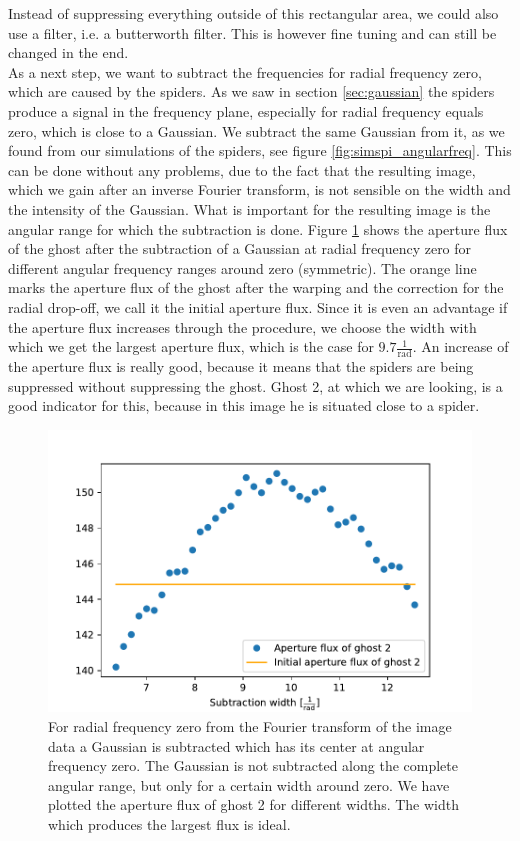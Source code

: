 Instead of suppressing everything outside of this rectangular area, we could also use a filter, i.e. a butterworth filter. This is however fine tuning and can still be changed in the end.\\
As a next step, we want to subtract the frequencies for radial frequency zero, which are caused by the spiders. As we saw in section \ref{sec:gaussian} the spiders produce a signal in the frequency plane, especially for radial frequency equals zero, which is close to a Gaussian. We subtract the same Gaussian from it, as we found from our simulations of the spiders, see figure \ref{fig:simspi_angularfreq}. This can be done without any problems, due to the fact that the resulting image, which we gain after an inverse Fourier transform, is not sensible on the width and the intensity of the Gaussian. What is important for the resulting image is the angular range for which the subtraction is done. Figure \ref{fig:rad0_diffsubwidths} shows the aperture flux of the ghost after the subtraction of a Gaussian at radial frequency zero for different angular frequency ranges around zero (symmetric). The orange line marks the aperture flux of the ghost after the warping and the correction for the radial drop-off, we call it the initial aperture flux. Since it is even an advantage if the aperture flux increases through the procedure, we choose the width with which we get the largest aperture flux, which is the case for $9.7 \frac{1}{\mathrm{rad}}$. An increase of the aperture flux is really good, because it means that the spiders are being suppressed without suppressing the ghost. Ghost 2, at which we are looking, is a good indicator for this, because in this image he is situated close to a spider.
\begin{figure}[H]
	\centering
		\includegraphics[width=1.0\textwidth]{pics/rad0_diffsubwidths.pdf}
		\caption{For radial frequency zero from the Fourier transform of the image data a Gaussian is subtracted which has its center at angular frequency zero. The Gaussian is not subtracted along the complete angular range, but only for a certain width around zero. We have plotted the aperture flux of ghost 2 for different widths. The width which produces the largest flux is ideal.}
		\label{fig:rad0_diffsubwidths}
\end{figure}
